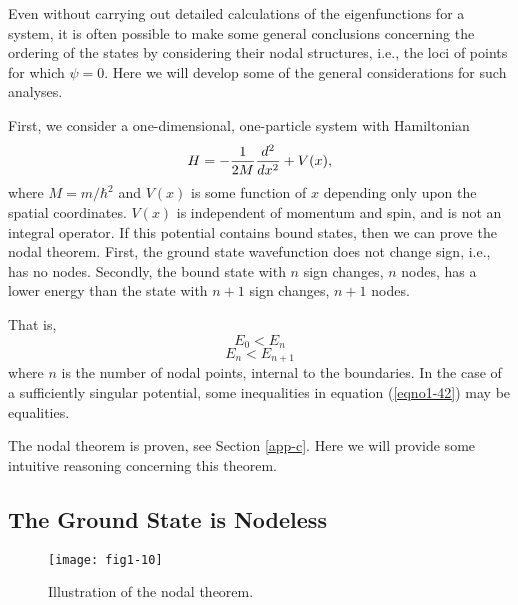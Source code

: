 Even without carrying out detailed calculations of the eigenfunctions for 
a system, it is often possible to make some general conclusions concerning 
the ordering of the states by considering their nodal structures, i.e., 
the loci of points for which $\psi = 0$. Here we will
develop some of the general considerations for such analyses.

First, we consider a one-dimensional, one-particle system with Hamiltonian
\begin{equation}
H = - {1 \over 2M} {d^2 \over dx^2} + V( x ),
\end{equation}
where $M = m/\hbar^2$ and $V(x)$ is some function of $x$ depending only 
upon the spatial coordinates. $V(x)$ is independent of momentum and spin, 
and is not an integral operator. If this potential contains bound states, 
then we can prove the nodal theorem. First, the ground
state wavefunction does not change sign, i.e., has no nodes. Secondly, 
the bound state with $n$ sign changes, $n$ nodes, has a lower energy than 
the state with $n + 1$ sign changes, $n + 1$ nodes.

That is,
\begin{equation}
E_0 < E_n
\end{equation}
\begin{equation}
E_n < E_{n+1}
\label{eqno1-42}
\end{equation}
where $n$ is the number of nodal points, internal to the
boundaries. In the case of a sufficiently singular potential, some
inequalities in equation (\ref{eqno1-42}) may be equalities.

The nodal theorem is proven, see Section \ref{app-c}. Here we will
provide some intuitive reasoning concerning this theorem.

\subsection{The Ground State is Nodeless}

\begin{figure}
\texttt{[image: fig1-10]}
\caption{Illustration of the nodal theorem.}
\label{fig1-10}
\end{figure}

